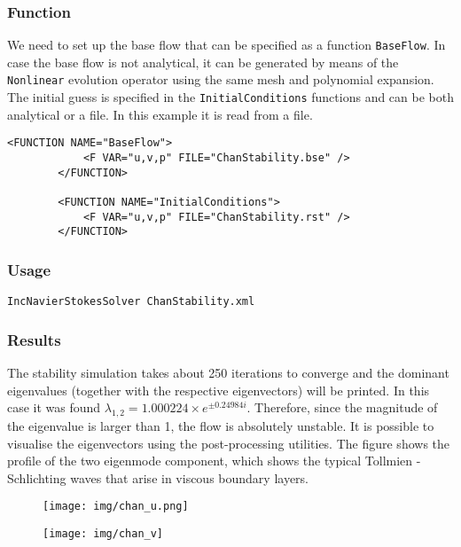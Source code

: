 \subsubsection{Function}

We need to set up the base flow that can be specified as a function \texttt{BaseFlow}. In case the base flow is not analytical, it can be generated by means of the \texttt{Nonlinear} evolution operator using the same mesh and polynomial expansion. The initial guess is specified in the \texttt{InitialConditions} functions and can be both analytical or a file. In this example it is read from a file.

    \begin{lstlisting}[style=XMLStyle]
<FUNCTION NAME="BaseFlow">
            <F VAR="u,v,p" FILE="ChanStability.bse" />
        </FUNCTION>

        <FUNCTION NAME="InitialConditions">
            <F VAR="u,v,p" FILE="ChanStability.rst" />
        </FUNCTION>
                         \end{lstlisting}



\subsubsection{Usage}

\texttt{IncNavierStokesSolver ChanStability.xml}


\subsubsection{Results}

The stability simulation takes about 250 iterations to converge and the dominant eigenvalues (together with the respective eigenvectors) will be printed. In this case it was found $    \lambda_{1,2}=1.000224 \times e^{\pm 0.24984i}$. Therefore, since the magnitude of the eigenvalue is larger than 1, the flow is absolutely unstable. It is possible to visualise the eigenvectors using the post-processing utilities. The figure shows the profile of the two eigenmode component, which shows the typical Tollmien - Schlichting waves that arise in viscous boundary layers.

\begin{figure}[!htbp]
\centering
 {\texttt{[image: img/chan\_u.png]}}
   \caption {}
\end{figure}

\begin{figure}[!htbp]
\centering
 {\texttt{[image: img/chan\_v]}}
    \caption {}
\end{figure}

